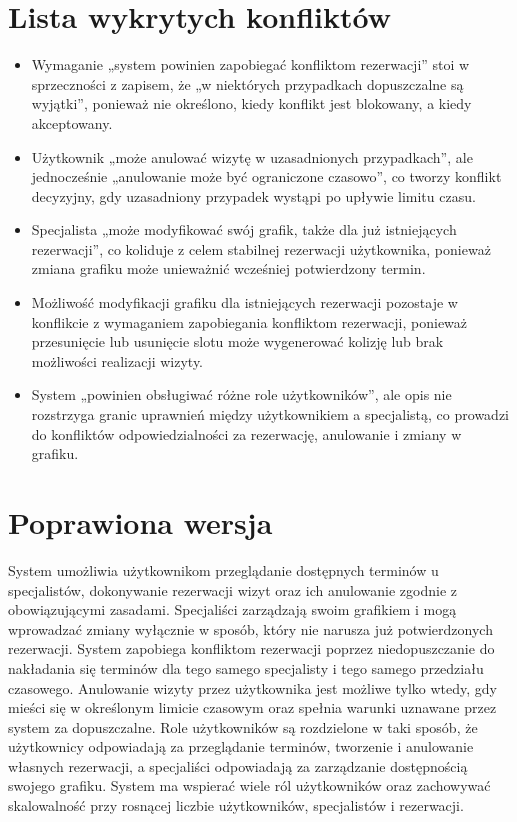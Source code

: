 \documentclass[12pt,a4paper]{article}
\begin{document}
\section{Lista wykrytych konfliktów}

\begin{itemize}[leftmargin=1.5em, label={-}]
  \item Wymaganie „system powinien zapobiegać konfliktom rezerwacji” stoi w sprzeczności z zapisem, że „w niektórych przypadkach dopuszczalne są wyjątki”, ponieważ nie określono, kiedy konflikt jest blokowany, a kiedy akceptowany.
  \item Użytkownik „może anulować wizytę w uzasadnionych przypadkach”, ale jednocześnie „anulowanie może być ograniczone czasowo”, co tworzy konflikt decyzyjny, gdy uzasadniony przypadek wystąpi po upływie limitu czasu.
  \item Specjalista „może modyfikować swój grafik, także dla już istniejących rezerwacji”, co koliduje z celem stabilnej rezerwacji użytkownika, ponieważ zmiana grafiku może unieważnić wcześniej potwierdzony termin.
  \item Możliwość modyfikacji grafiku dla istniejących rezerwacji pozostaje w konflikcie z wymaganiem zapobiegania konfliktom rezerwacji, ponieważ przesunięcie lub usunięcie slotu może wygenerować kolizję lub brak możliwości realizacji wizyty.
  \item System „powinien obsługiwać różne role użytkowników”, ale opis nie rozstrzyga granic uprawnień między użytkownikiem a specjalistą, co prowadzi do konfliktów odpowiedzialności za rezerwację, anulowanie i zmiany w grafiku.
\end{itemize}

\section{Poprawiona wersja}

System umożliwia użytkownikom przeglądanie dostępnych terminów u specjalistów, dokonywanie rezerwacji wizyt oraz ich anulowanie zgodnie z obowiązującymi zasadami. Specjaliści zarządzają swoim grafikiem i mogą wprowadzać zmiany wyłącznie w sposób, który nie narusza już potwierdzonych rezerwacji. System zapobiega konfliktom rezerwacji poprzez niedopuszczanie do nakładania się terminów dla tego samego specjalisty i tego samego przedziału czasowego. Anulowanie wizyty przez użytkownika jest możliwe tylko wtedy, gdy mieści się w określonym limicie czasowym oraz spełnia warunki uznawane przez system za dopuszczalne. Role użytkowników są rozdzielone w taki sposób, że użytkownicy odpowiadają za przeglądanie terminów, tworzenie i anulowanie własnych rezerwacji, a specjaliści odpowiadają za zarządzanie dostępnością swojego grafiku. System ma wspierać wiele ról użytkowników oraz zachowywać skalowalność przy rosnącej liczbie użytkowników, specjalistów i rezerwacji.
\end{document}

